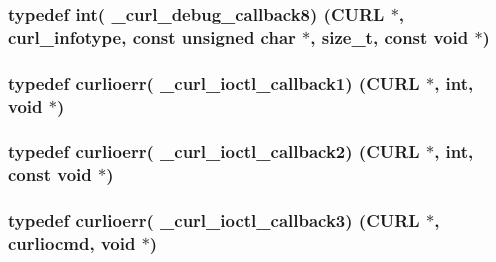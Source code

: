 \subsubsection[{\texorpdfstring{\+\_\+curl\+\_\+debug\+\_\+callback8}{_curl_debug_callback8}}]{\setlength{\rightskip}{0pt plus 5cm}typedef int( \+\_\+curl\+\_\+debug\+\_\+callback8) ({\bf C\+U\+RL} $\ast$, {\bf curl\+\_\+infotype}, const unsigned char $\ast$, size\+\_\+t, const void $\ast$)}\hypertarget{typecheck-gcc_8h_a5c3caa775cdc5419a7934129fe16eae8}{}\label{typecheck-gcc_8h_a5c3caa775cdc5419a7934129fe16eae8}
\subsubsection[{\texorpdfstring{\+\_\+curl\+\_\+ioctl\+\_\+callback1}{_curl_ioctl_callback1}}]{\setlength{\rightskip}{0pt plus 5cm}typedef {\bf curlioerr}( \+\_\+curl\+\_\+ioctl\+\_\+callback1) ({\bf C\+U\+RL} $\ast$, int, void $\ast$)}\hypertarget{typecheck-gcc_8h_aac1891bdfef140df9bb64a06ed047fcc}{}\label{typecheck-gcc_8h_aac1891bdfef140df9bb64a06ed047fcc}
\subsubsection[{\texorpdfstring{\+\_\+curl\+\_\+ioctl\+\_\+callback2}{_curl_ioctl_callback2}}]{\setlength{\rightskip}{0pt plus 5cm}typedef {\bf curlioerr}( \+\_\+curl\+\_\+ioctl\+\_\+callback2) ({\bf C\+U\+RL} $\ast$, int, const void $\ast$)}\hypertarget{typecheck-gcc_8h_afcf7a9e1d185d392c778b714db3112d1}{}\label{typecheck-gcc_8h_afcf7a9e1d185d392c778b714db3112d1}
\subsubsection[{\texorpdfstring{\+\_\+curl\+\_\+ioctl\+\_\+callback3}{_curl_ioctl_callback3}}]{\setlength{\rightskip}{0pt plus 5cm}typedef {\bf curlioerr}( \+\_\+curl\+\_\+ioctl\+\_\+callback3) ({\bf C\+U\+RL} $\ast$, {\bf curliocmd}, void $\ast$)}\hypertarget{typecheck-gcc_8h_ae7c200fd4adb189b92a5373f59711ef8}{}\label{typecheck-gcc_8h_ae7c200fd4adb189b92a5373f59711ef8}

